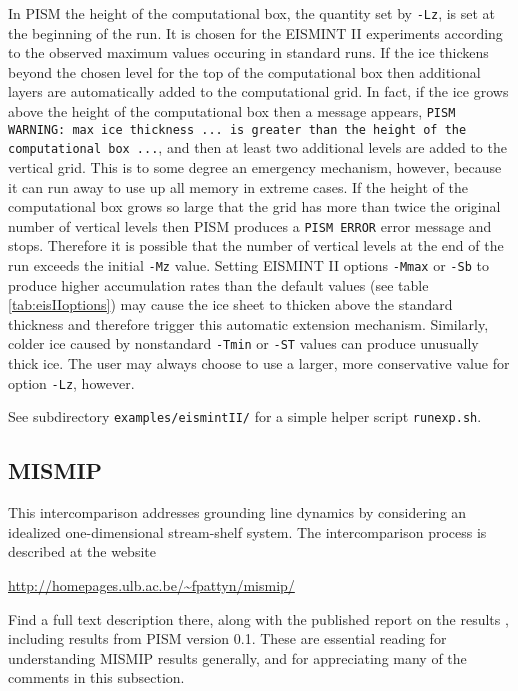 In PISM the height of the computational box, the quantity set by \texttt{-Lz}, is set at the beginning of the run.  It is chosen for the EISMINT II experiments according to the observed maximum values occuring in standard runs.  If the ice thickens beyond the chosen level for the top of the computational box then additional layers are automatically added to the computational grid.  In fact, if the ice grows above the height of the computational box then a message appears, \texttt{PISM WARNING: max ice thickness ... is greater than the height of the computational box ...}, and then at least two additional levels are added to the vertical grid.  This is to some degree an emergency mechanism, however, because it can run away to use up all memory in extreme cases.  If the height of the computational box grows so large that the grid has more than twice the original number of vertical levels then PISM produces a \texttt{PISM ERROR} error message and stops.   Therefore it is possible that the number of vertical levels at the end of the run exceeds the initial \texttt{-Mz} value.  Setting EISMINT II options \texttt{-Mmax} or \texttt{-Sb} to produce higher accumulation rates than the default values (see table \ref{tab:eisIIoptions}) may cause the ice sheet to thicken above the standard thickness and therefore trigger this automatic extension mechanism.  Similarly, colder ice caused by nonstandard \texttt{-Tmin} or \texttt{-ST} values can produce unusually thick ice.  The user may always choose to use a larger, more conservative value for option \texttt{-Lz}, however.

See subdirectory \verb|examples/eismintII/| for a simple helper script \verb|runexp.sh|.


\subsection{MISMIP}\label{subsect:MISMIP}

This intercomparison addresses grounding line dynamics by considering an idealized one-dimensional stream-shelf system.  The intercomparison process is described at the website

\centerline{\url{http://homepages.ulb.ac.be/~fpattyn/mismip/}}

\noindent Find a full text description there, along with the published report on the results \cite{MISMIP2012}, including results from PISM version 0.1.  These are essential reading for understanding MISMIP results generally, and for appreciating many of the comments in this subsection.

